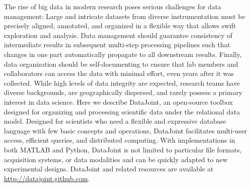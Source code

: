 The rise of big data in modern research poses serious challenges for
data management: Large and intricate datasets from diverse
instrumentation must be precisely aligned, annotated, and organized in
a flexible way that allows swift exploration and analysis. Data
management should guarantee consistency of intermediate results in
subsequent multi-step processing pipelines such that changes in one
part automatically propagate to all downstream results. Finally, data
organization should be self-documenting to ensure that lab members and
collaborators can access the data with minimal effort, even years
after it was collected. While high levels of data integrity are
expected, research teams have diverse backgrounds, are geographically
dispersed, and rarely possess a primary interest in data science.
Here we describe DataJoint, an open-source toolbox designed for
organizing and processing scientific data under the relational data
model.  Designed for scientists who need a flexible and expressive
database language with few basic concepts and operations, DataJoint
facilitates multi-user access, efficient queries, and distributed
computing.  With implementations in both MATLAB and Python, DataJoint
is not limited to particular file formats, acquisition systems, or
data modalities and can be quickly adapted to new experimental
designs.  DataJoint and related resources are available at
\url{http://datajoint.github.com}.
